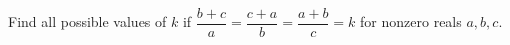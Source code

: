 Find all possible values of $k$ if $\dfrac{b+c}a=\dfrac{c+a}b=\dfrac{a+b}c=k$ for nonzero reals $a,b,c$.
